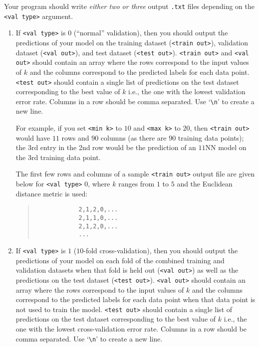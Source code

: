 \documentclass[11pt,addpoints,answers]{exam}
\begin{document}
Your program should write \emph{either two or three} output \lstinline{.txt} files depending on the \lstinline{<val type>} argument. 
\begin{enumerate}
    \item If \lstinline{<val type>} is $0$ (``normal'' validation), then you should output the predictions of your model on the training dataset (\lstinline{<train out>}), validation dataset (\lstinline{<val out>}), and test dataset (\lstinline{<test out>}). \lstinline{<train out>} and \lstinline{<val out>} should contain an array where the rows correspond to the input values of $k$ and the columns correspond to the predicted labels for each data point. \lstinline{<test out>} should contain a single list of predictions on the test dataset corresponding to the best value of $k$ i.e., the one with the lowest validation error rate. Columns in a row should be comma separated. Use `\texttt{\textbackslash n}' to create a new line.

    For example, if you set \lstinline{<min k>} to $10$ and \lstinline{<max k>} to $20$, then \lstinline{<train out>} would have $11$ rows and $90$ columns (as there are $90$ training data points); the 3rd entry in the 2nd row would be the prediction of an $11$NN model on the 3rd training data point. 
    
    The first few rows and columns of a sample \lstinline{<train out>} output file are given below for \lstinline{<val type>} $0$, where $k$ ranges from $1$ to $5$ and the Euclidean distance metric is used:
    \begin{quote}
        \begin{verbatim}
            2,1,2,0,...
            2,1,1,0,...
            2,1,2,0,...
            ...
        \end{verbatim}
    \end{quote}
    
    \item If \lstinline{<val type>} is $1$ ($10$-fold cross-validation), then you should output the predictions of your model on each fold of the combined training and validation datasets when that fold is held out (\lstinline{<val out>}) as well as the predictions on the test dataset (\lstinline{<test out>}). \lstinline{<val out>} should contain an array where the rows correspond to the input values of $k$ and the columns correspond to the predicted labels for each data point when that data point is not used to train the model. \lstinline{<test out>} should contain a single list of predictions on the test dataset corresponding to the best value of $k$ i.e., the one with the lowest cross-validation error rate. Columns in a row should be comma separated. Use `\texttt{\textbackslash n}' to create a new line.


\end{enumerate}
\end{document}
